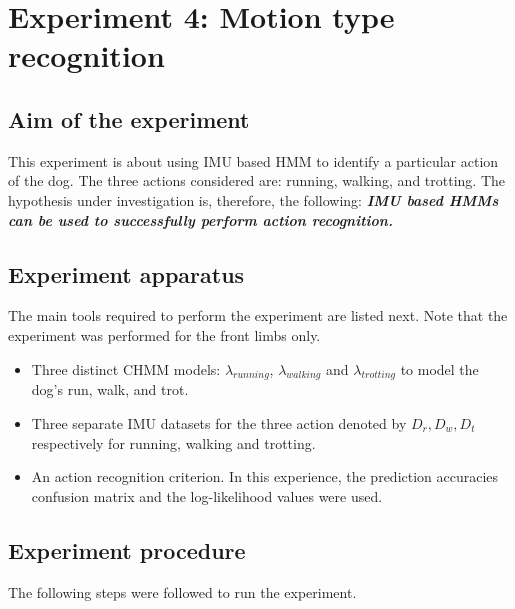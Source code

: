 \section{Experiment 4: Motion type recognition}  \label{exp:motion}

\subsection{Aim of the experiment}
This experiment is about using IMU based HMM to identify a particular action of the dog. The three actions considered are: running, walking, and trotting.
The hypothesis under investigation is, therefore, the following:
\textbf{\textit{IMU based HMMs can be used to successfully perform action recognition.}}

\subsection{Experiment apparatus}
The main tools required to perform the experiment are listed next. Note that the experiment was performed for the front limbs only.
\begin{itemize}
	\item Three distinct CHMM models: \(\lambda_{running}\), \(\lambda_{walking}\) and \(\lambda_{trotting}\) to model the dog's run, walk, and trot.
	\item Three separate IMU datasets for the three action denoted by \(D_r, D_w, D_t\) respectively for running, walking and trotting.
	\item An action recognition criterion. In this experience, the prediction accuracies confusion matrix and the log-likelihood values were used.
\end{itemize}

\subsection{Experiment procedure}
The following steps were followed to run the experiment.

